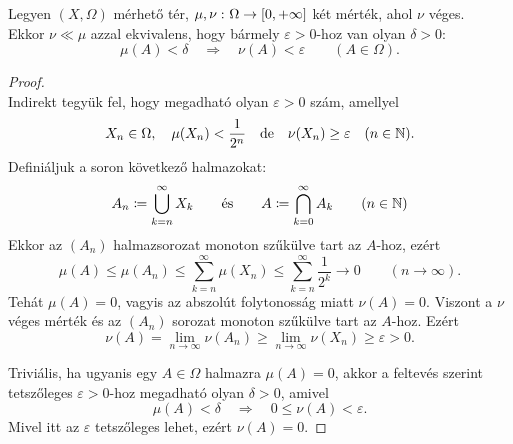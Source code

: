 \documentclass[
]{elteikthesis}[2024/04/26]
\begin{document}
	\begin{lemma}{}{}
		Legyen \( (X, \Omega) \) mérhető tér, 
		\( \mu, \nu \,\colon \Omega \to [0, +\infty] \) két mérték, ahol \( \nu \) véges.\\[6pt]
		Ekkor \( \nu \ll \mu \) azzal ekvivalens, hogy
		bármely \( \varepsilon > 0 \)-hoz van olyan \( \delta > 0 \):
		\[
			\mu(A) < \delta
			\quad \Longrightarrow \quad
			\nu(A) < \varepsilon
			\qquad (A \in \Omega).
		\]
	\end{lemma}
	\begin{proof}\,\\
		\Ifstep
		Indirekt tegyük fel, hogy megadható olyan \( \varepsilon > 0 \) szám, amellyel
		\[
			X_n \in \Omega, \quad 
			\mu(X_n) < \frac{1}{2^n} 
			\quad \text{de} \quad
			\nu( X_n ) \geq \varepsilon \quad (n \in \mathbb{N}).
		\]
		Definiáljuk a soron következő halmazokat:
		\[
			A_n \coloneq \bigcup_{k=n}^{\infty} X_k 
			\qquad \text{és} \qquad
			A \coloneq \bigcap_{k=0}^{\infty} A_k
			\qquad (n \in \mathbb{N})
		\]
		Ekkor az \( (A_n) \) halmazsorozat monoton szűkülve tart az \( A \)-hoz, ezért
		\[
			\mu( A ) \leq 
			\mu( A_n ) \leq 
			\sum_{k=n}^{\infty} \mu( X_n ) \leq
			\sum_{k=n}^{\infty} \frac{1}{2^k}
			\longrightarrow 0
			\qquad (n \to \infty).
		\]
		Tehát \( \mu(A) = 0 \), vagyis az abszolút folytonosság miatt \( \nu(A) = 0 \).
		Viszont a \( \nu \) véges mérték és az \( (A_n) \) sorozat monoton szűkülve tart az \( A \)-hoz. Ezért
		\[
			\nu(A) = 
			\lim_{n \to \infty} \nu(A_n) \geq 
			\lim_{n \to \infty} \nu(X_n) \geq 
			\varepsilon > 0.
		\]
		
		\Backifstep Triviális, ha ugyanis egy \( A \in \Omega \) halmazra \( \mu(A) = 0 \), 
		akkor a feltevés szerint tetszőleges \( \varepsilon > 0 \)-hoz megadható olyan \( \delta > 0 \), amivel
		\[
			\mu(A) < \delta
			\quad \Longrightarrow \quad
			0 \leq \nu(A) < \varepsilon.
		\]
		Mivel itt az \( \varepsilon \) tetszőleges lehet, ezért \( \nu(A) = 0 \).
	\end{proof}
	
\end{document}
